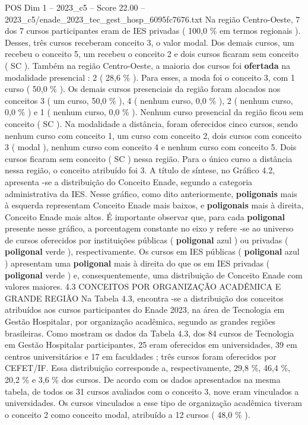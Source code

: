 \begin{textsample}{POS Dim 1 – 2023\_c5 – Score 22.00 – 2023\_c5/enade\_2023\_tec\_gest\_hosp\_6095fc7676.txt}
Na região Centro-Oeste, 7 dos 7 cursos participantes eram de IES privadas ( 100,0 \% em termos regionais ).
Desses, três cursos receberam conceito 3, o valor modal.
Dos demais cursos, um recebeu o conceito 5, um recebeu o conceito 2 e dois cursos ficaram sem conceito ( SC ).
Também na região Centro-Oeste, a maioria dos cursos foi \textbf{ofertada} na modalidade presencial : 2 ( 28,6 \% ).
Para esses, a moda foi o conceito 3, com 1 curso ( 50,0 \% ).
Os demais cursos presenciais da região foram alocados nos conceitos 3 ( um curso, 50,0 \% ), 4 ( nenhum curso, 0,0 \% ), 2 ( nenhum curso, 0,0 \% ) e 1 ( nenhum curso, 0,0 \% ).
Nenhum curso presencial da região ficou sem conceito ( SC ).
Na modalidade a distância, foram oferecidos cinco cursos, sendo nenhum curso com conceito 1, um curso com conceito 2, dois cursos com conceito 3 ( modal ), nenhum curso com conceito 4 e nenhum curso com conceito 5.
Dois cursos ficaram sem conceito ( SC ) nessa região.
Para o único curso a distância nessa região, o conceito atribuído foi 3.
A título de síntese, no Gráfico 4.2, apresenta -se a distribuição do Conceito Enade, segundo a categoria administrativa da IES.
Nesse gráfico, como dito anteriormente, \textbf{poligonais} mais à esquerda representam Conceito Enade mais baixos, e \textbf{poligonais} mais à direita, Conceito Enade mais altos.
É importante observar que, para cada \textbf{poligonal} presente nesse gráfico, a porcentagem constante no eixo y refere -se ao universo de cursos oferecidos por instituições públicas ( \textbf{poligonal} azul ) ou privadas ( \textbf{poligonal} verde ), respectivamente.
Os cursos em IES públicas ( \textbf{poligonal} azul ) apresentam uma \textbf{poligonal} mais à direita do que os em IES privadas ( \textbf{poligonal} verde ) e, consequentemente, uma distribuição de Conceito Enade com valores maiores. 4.3 CONCEITOS POR ORGANIZAÇÃO ACADÊMICA E GRANDE REGIÃO Na Tabela 4.3, encontra -se a distribuição dos conceitos atribuídos aos cursos participantes do Enade 2023, na área de Tecnologia em Gestão Hospitalar, por organização acadêmica, segundo as grandes regiões brasileiras.
Como mostram os dados da Tabela 4.3, dos 84 cursos de Tecnologia em Gestão Hospitalar participantes, 25 eram oferecidos em universidades, 39 em centros universitários e 17 em faculdades ; três cursos foram oferecidos por CEFET/IF.
Essa distribuição corresponde a, respectivamente, 29,8 \%, 46,4 \%, 20,2 \% e 3,6 \% dos cursos.
De acordo com os dados apresentados na mesma tabela, de todos os 31 cursos avaliados com o conceito 3, nove eram vinculados a universidades.
Os cursos vinculados a esse tipo de organização acadêmica tiveram o conceito 2 como conceito modal, atribuído a 12 cursos ( 48,0 \% ).

\end{textsample}
